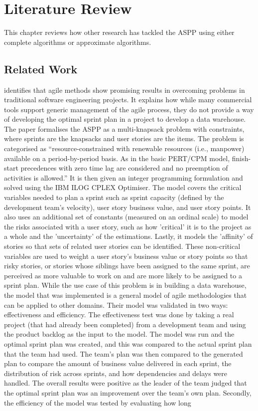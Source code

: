 
\chapter{Literature Review}
\label{ChapterLiteratureReview}

This chapter reviews how other research has tackled the ASPP using either complete algorithms or approximate algorithms.

\section{Related Work}

\citet{golfarelli2012sprint} identifies that agile methods show promising results in overcoming problems in traditional software engineering projects. It explains how while many commercial tools support generic management of the agile process, they do not provide a way of developing the optimal sprint plan in a project to develop a data warehouse. The paper formalises the ASPP as a multi-knapsack problem with constraints, where sprints are the knapsacks and user stories are the items. The problem is categorised as \enquote{resource-constrained with renewable resources (i.e., manpower) available on a period-by-period basis. As in the basic PERT/CPM model, finish-start precedences with zero time lag are considered and no preemption of activities is allowed.} It is then given an integer programming formulation and solved using the IBM ILOG CPLEX Optimiser. The model covers the critical variables needed to plan a sprint such as sprint capacity (defined by the development team's velocity), user story business value, and user story points. It also uses an additional set of constants (measured on an ordinal scale) to model the risks associated with a user story, such as how 'critical' it is to the project as a whole and the 'uncertainty' of the estimations. Lastly, it models the 'affinity' of stories so that sets of related user stories can be identified. These non-critical variables are used to weight a user story's business value or story points so that risky stories, or stories whose siblings have been assigned to the same sprint, are perceived as more valuable to work on and are more likely to be assigned to a sprint plan. While the use case of this problem is in building a data warehouse, the model that was implemented is a general model of agile methodologies that can be applied to other domains. Their model was validated in two ways: effectiveness and efficiency. The effectiveness test was done by taking a real project (that had already been completed) from a development team and using the product backlog as the input to the model. The model was run and the optimal sprint plan was created, and this was compared to the actual sprint plan that the team had used. The team's plan was then compared to the generated plan to compare the amount of business value delivered in each sprint, the distribution of risk across sprints, and how dependencies and delays were handled. The overall results were positive as the leader of the team judged that the optimal sprint plan was an improvement over the team's own plan. Secondly, the efficiency of the model was tested by evaluating how long 
